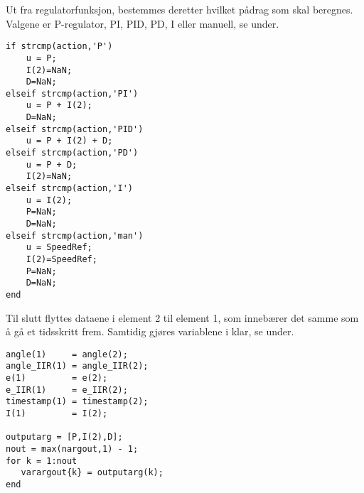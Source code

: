 Ut fra regulatorfunksjon, bestemmes deretter hvilket pådrag som skal
beregnes. Valgene er P-regulator, PI, PID, PD, I eller manuell, se
under.
\begin{lstlisting}[caption=Kode fra funksjonen for turtallsregulering av motor A.,
  label=kode:resten3, firstnumber=31]
if strcmp(action,'P') 
    u = P;
    I(2)=NaN;
    D=NaN;
elseif strcmp(action,'PI')
    u = P + I(2);
    D=NaN;
elseif strcmp(action,'PID')
    u = P + I(2) + D;
elseif strcmp(action,'PD')
    u = P + D;
    I(2)=NaN;
elseif strcmp(action,'I')
    u = I(2);
    P=NaN;
    D=NaN;
elseif strcmp(action,'man')
    u = SpeedRef;
    I(2)=SpeedRef;
    P=NaN;
    D=NaN;
end
\end{lstlisting}

Til slutt flyttes dataene i element 2 til element 1, som innebærer det
samme som å gå et tidsskritt frem. Samtidig gjøres variablene i
 klar, se  under.
\begin{lstlisting}[caption=Kode fra funksjonen for turtallsregulering av motor A.,
  label=kode:resten4, firstnumber=31]
angle(1)     = angle(2);
angle_IIR(1) = angle_IIR(2);
e(1)         = e(2);
e_IIR(1)     = e_IIR(2);
timestamp(1) = timestamp(2);
I(1)         = I(2);

outputarg = [P,I(2),D];
nout = max(nargout,1) - 1;
for k = 1:nout
   varargout{k} = outputarg(k);
end


\end{lstlisting}




